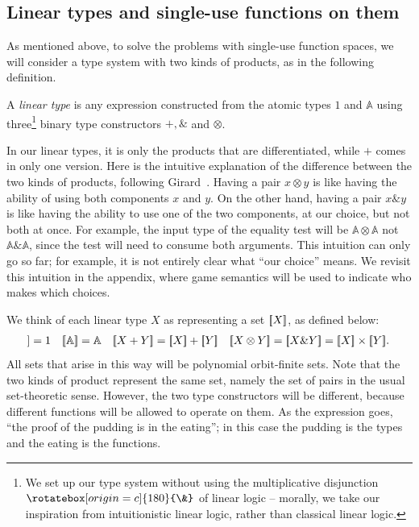 \documentclass[10pt,a4paper]{amsart}
\numberwithin{equation}{section}
\theoremstyle{plain}
\newcommand{\sem}[1]{[{\kern-0.45ex}[#1]{\kern-0.45ex}]}
\newcommand{\atoms}{\mathbb A}
\begin{document}
\subsection{Linear types and single-use functions on them}
\label{sec:linear-types-and-single-use-functions}
As mentioned above, to solve the problems with single-use function spaces, we will consider a type system with two kinds of products, as in the following definition.
\begin{definition}\label{def:datatypes}
    A \emph{linear type} is any expression constructed from the atomic types $1$ and $\atoms$ using three\footnote{We set up our type system without using the multiplicative disjunction $\rotatebox[origin=c]{180}{\&}$ of linear logic -- morally, we take our inspiration from intuitionistic linear logic, rather than classical linear logic.} binary type constructors $+, \&$ and $\otimes$.
\end{definition}
In our linear types, it is only the products that are differentiated, while  $+$ comes in only one version. 
    Here is the intuitive explanation of the difference between the two kinds of products, following Girard~\cite[p.2]{girard1995advances}. Having a pair $x \otimes y$ is like having the ability of using both components $x$ and $y$. On the other hand, having a pair $x \& y$ is like having the ability to use one of the two components, at our choice, but not both at once. For example, the input type of the equality test will be $\atoms \otimes \atoms$ not $\atoms \& \atoms$, since the test will need to consume both arguments. This intuition can only go so far; for example, it is not entirely clear what ``our choice'' means. We revisit this intuition in  the appendix, where game semantics will be used to indicate who makes which choices. 



We think of each linear type $X$ as representing a set $\sem X$, as defined below:
\begin{align*}
    \sem{1} = 1
\quad 
\sem{\atoms} = \atoms 
\quad 
\sem{X+Y} = \sem X + \sem Y 
\quad 
\sem{X \otimes Y} =
\sem{X \& Y} = \sem X \times \sem Y.
\end{align*}
All sets that arise in this way will be polynomial orbit-finite sets.
Note that the two kinds of product represent the same set, namely the set of pairs in the usual set-theoretic sense. 
However, the two type constructors will be  different, because different functions will be allowed to operate on them. As the expression goes, ``the proof of the pudding is in the eating''; in this case the pudding is the types and the eating is the functions.  
\end{document}
